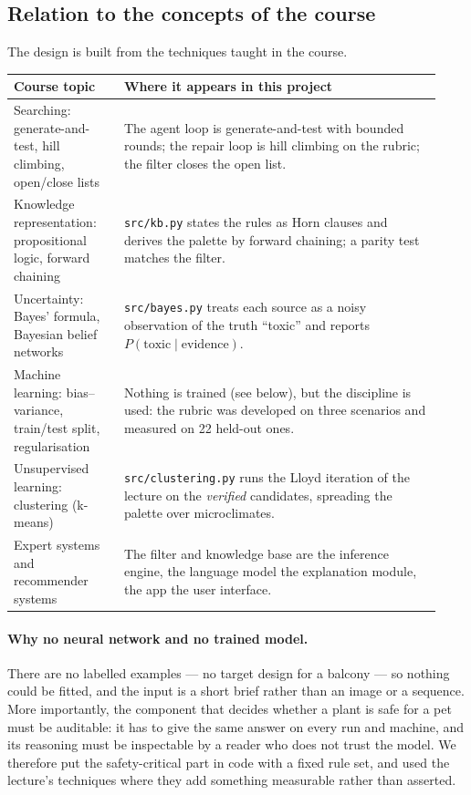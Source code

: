 \documentclass[12pt,a4paper]{article}
\begin{document}
\subsection{Relation to the concepts of the course}\label{sec:concepts}

The design is built from the techniques taught in the course.

\begin{center}
\footnotesize
\setlength{\tabcolsep}{4pt}
\begin{tabular}{p{0.24\linewidth} p{0.69\linewidth}}
\toprule
\textbf{Course topic} & \textbf{Where it appears in this project} \\
\midrule
Searching: generate-and-test, hill climbing, open/close lists &
The agent loop is generate-and-test with bounded rounds; the repair loop is
hill climbing on the rubric; the filter closes the open list. \\
Knowledge representation: propositional logic, forward chaining &
\texttt{src/kb.py} states the rules as Horn clauses and derives the palette by
forward chaining; a parity test matches the filter. \\
Uncertainty: Bayes' formula, Bayesian belief networks &
\texttt{src/bayes.py} treats each source as a noisy observation of the truth
``toxic'' and reports $P(\mathrm{toxic}\mid\mathrm{evidence})$. \\
Machine learning: bias--variance, train/test split, regularisation &
Nothing is trained (see below), but the discipline is used: the rubric was
developed on three scenarios and measured on 22 held-out ones. \\
Unsupervised learning: clustering (k-means) &
\texttt{src/clustering.py} runs the Lloyd iteration of the lecture on the
\emph{verified} candidates, spreading the palette over microclimates. \\
Expert systems and recommender systems &
The filter and knowledge base are the inference engine, the language model the
explanation module, the app the user interface. \\
\bottomrule
\end{tabular}
\end{center}

\paragraph{Why no neural network and no trained model.}
There are no labelled examples --- no target design for a balcony --- so
nothing could be fitted, and the input is a short brief rather than an image
or a sequence. More importantly, the component that decides whether a plant
is safe for a pet must be auditable: it has to give the same answer on every
run and machine, and its reasoning must be inspectable by a reader who does
not trust the model. We therefore put the safety-critical part in code with a
fixed rule set, and used the lecture's techniques where they add something
measurable rather than asserted.
\end{document}

